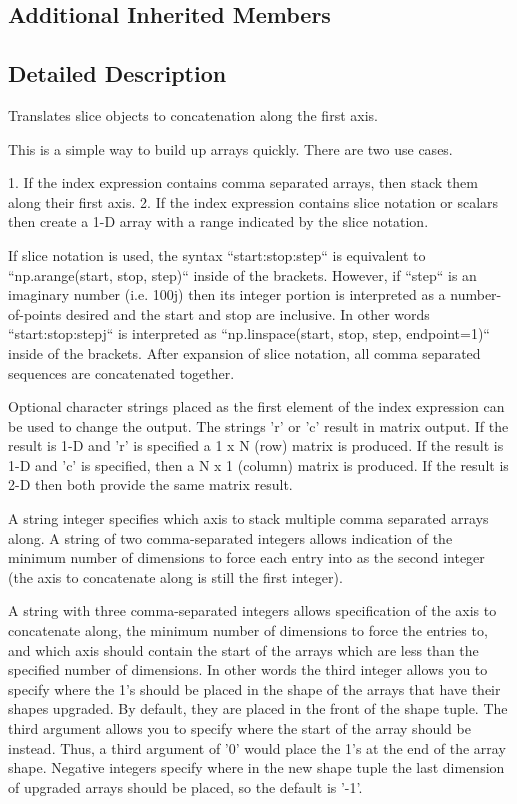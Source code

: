 \subsection*{Additional Inherited Members}


\subsection{Detailed Description}
\begin{DoxyVerb}Translates slice objects to concatenation along the first axis.

This is a simple way to build up arrays quickly. There are two use cases.

1. If the index expression contains comma separated arrays, then stack
   them along their first axis.
2. If the index expression contains slice notation or scalars then create
   a 1-D array with a range indicated by the slice notation.

If slice notation is used, the syntax ``start:stop:step`` is equivalent
to ``np.arange(start, stop, step)`` inside of the brackets. However, if
``step`` is an imaginary number (i.e. 100j) then its integer portion is
interpreted as a number-of-points desired and the start and stop are
inclusive. In other words ``start:stop:stepj`` is interpreted as
``np.linspace(start, stop, step, endpoint=1)`` inside of the brackets.
After expansion of slice notation, all comma separated sequences are
concatenated together.

Optional character strings placed as the first element of the index
expression can be used to change the output. The strings 'r' or 'c' result
in matrix output. If the result is 1-D and 'r' is specified a 1 x N (row)
matrix is produced. If the result is 1-D and 'c' is specified, then a N x 1
(column) matrix is produced. If the result is 2-D then both provide the
same matrix result.

A string integer specifies which axis to stack multiple comma separated
arrays along. A string of two comma-separated integers allows indication
of the minimum number of dimensions to force each entry into as the
second integer (the axis to concatenate along is still the first integer).

A string with three comma-separated integers allows specification of the
axis to concatenate along, the minimum number of dimensions to force the
entries to, and which axis should contain the start of the arrays which
are less than the specified number of dimensions. In other words the third
integer allows you to specify where the 1's should be placed in the shape
of the arrays that have their shapes upgraded. By default, they are placed
in the front of the shape tuple. The third argument allows you to specify
where the start of the array should be instead. Thus, a third argument of
'0' would place the 1's at the end of the array shape. Negative integers
specify where in the new shape tuple the last dimension of upgraded arrays
should be placed, so the default is '-1'.


\end{DoxyVerb}
